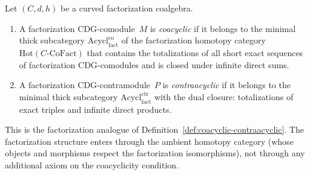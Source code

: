 \begin{definition}
\label{def:coacyclic-fact}
Let $(C, d, h)$ be a curved factorization coalgebra.
\begin{enumerate}[label=\textup{(\roman*)}]
\item A factorization CDG-comodule~$M$ is \emph{coacyclic} if it
 belongs to the minimal thick subcategory
 $\mathrm{Acycl}^{\mathrm{co}}_{\mathrm{fact}}$
 of the factorization homotopy category
 $\mathrm{Hot}(C\text{-}\mathrm{CoFact})$
 that contains the totalizations of all short exact sequences of
 factorization CDG-comodules and is closed under
 infinite direct sums.
\item A factorization CDG-contramodule~$P$ is
 \emph{contraacyclic} if it belongs to the minimal thick
 subcategory
 $\mathrm{Acycl}^{\mathrm{ctr}}_{\mathrm{fact}}$
 with the dual closure: totalizations of exact triples and
 infinite direct products.
\end{enumerate}
This is the factorization analogue of
Definition~\ref{def:coacyclic-contraacyclic}. The factorization
structure enters through the ambient homotopy category (whose
objects and morphisms respect the factorization isomorphisms), not
through any additional axiom on the coacyclicity condition.
\end{definition}

